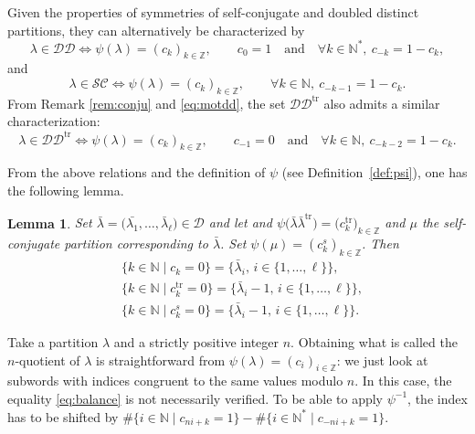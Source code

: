 \documentclass[pdftex]{sigma}
\newtheorem{Lemma}[Theorem]{Lemma}
\numberwithin{equation}{section}
\def\ccsc{\mathcal {SC}}
\def\ccdd{\mathcal {DD}}
\def\ccd{\mathcal {D}}
\newcommand{\Z}{\mathbb{Z}}
\newcommand{\N}{\mathbb{N}}
\begin{document}
Given the properties of symmetries of self-conjugate and doubled distinct partitions, they can alternatively be characterized by
\begin{equation}\label{eq:motdd}
\lambda\in\ccdd \iff \psi(\lambda)=(c_k)_{k\in\Z}, \qquad c_0=1  \quad \text{and} \quad  \forall k \in \N^*,\ c_{-k}=1-c_k,
\end{equation}
and
\begin{equation*}%
\lambda\in\ccsc \iff \psi(\lambda)=(c_k)_{k\in\Z}, \qquad \forall k \in \N,\ c_{-k-1}=1-c_k.
\end{equation*}
From Remark \ref{rem:conju} and \eqref{eq:motdd}, the set $\ccdd^{\mathrm{tr}}$ also admits a similar characterization:
\begin{equation}\label{eq:motddprime}
\lambda\in\ccdd ^{\mathrm{tr}}\iff \psi(\lambda)=(c_k)_{k\in\Z},\qquad  c_{-1}=0  \quad \text{and} \quad  \forall k \in \N,\ c_{-k-2}=1-c_k.
\end{equation}

From the above relations and the definition of $\psi$ (see Definition~\ref{def:psi}), one has the following lemma.
\begin{Lemma}\label{lem:distinct}
Set $\bar{\lambda}=\bigl(\bar{\lambda_1},\dots,\bar{\lambda}_\ell\bigr)\in\ccd$ and let \smash{$\psi\bigl(\bar{\lambda}\bar{\lambda}\bigr)=(c_k)_{k\in\Z}$} and $\psi\bigl(\bar{\lambda}\bar{\lambda}^{\mathrm{tr}}\bigr)=\bigl(c^{\mathrm{tr}}_k\bigr)_{k\in\Z}$ and $\mu$ the self-conjugate partition corresponding to $\bar{\lambda}$. Set $\psi(\mu)=(c^{s}_k)_{k\in\Z}$. Then
\begin{align*}
&\lbrace k\in\N\mid c_k=0\rbrace=\bigl\lbrace \bar{\lambda}_i,\, i\in\lbrace 1,\dots,\ell\rbrace\bigr\rbrace,\\
&\bigl\lbrace k\in\N\mid c^{\mathrm{tr}}_k=0\bigr\rbrace=\big\lbrace \bar{\lambda}_i-1,\, i\in\lbrace 1,\dots,\ell\rbrace\big\rbrace,\\
&\lbrace k\in\N\mid c^{s}_k=0\rbrace=\big\lbrace \bar{\lambda}_i-1,\, i\in\lbrace 1,\dots,\ell\rbrace\big\rbrace.
\end{align*}
\end{Lemma}

Take a partition $\lambda$ and a strictly positive integer $n$. Obtaining what is called the $n$-quotient of $\lambda$ is straightforward from $\psi(\lambda)=(c_i)_{i\in\Z}$: we just look at subwords with indices congruent to the same values modulo $n$. In this case, the equality \eqref{eq:balance} is not necessarily verified. To be able to apply $\psi^{-1}$, the index has to be shifted by $\#\lbrace i\in\N \mid c_{ni+k}=1\rbrace-\#\lbrace i\in\N^* \mid c_{-ni+k}=1\rbrace$.
\end{document}
